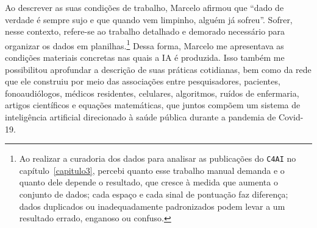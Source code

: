 Ao descrever as suas condições de trabalho, Marcelo afirmou que \enquote{dado de verdade é sempre sujo e que quando vem limpinho, alguém já sofreu}. Sofrer, nesse contexto, refere-se ao trabalho detalhado e demorado necessário para organizar os dados em planilhas.\footnote{Ao realizar a curadoria dos dados para analisar as publicações do \texttt{C4AI} no capítulo~\ref{capitulo3}, percebi quanto esse trabalho manual demanda e o quanto dele depende o resultado, que cresce à medida que aumenta o conjunto de dados; cada espaço e cada sinal de pontuação faz diferença; dados duplicados ou inadequadamente padronizados podem levar a um resultado errado, enganoso ou confuso.} Dessa forma, Marcelo me apresentava as condições materiais concretas nas quais a IA é produzida. Isso também me possibilitou aprofundar a descrição de suas práticas cotidianas, bem como da rede que ele construiu por meio das associações entre pesquisadores, pacientes, fonoaudiólogos, médicos residentes, celulares, algoritmos, ruídos de enfermaria, artigos científicos e equações matemáticas, que juntos compõem um sistema de inteligência artificial direcionado à saúde pública durante a pandemia de Covid-19.

